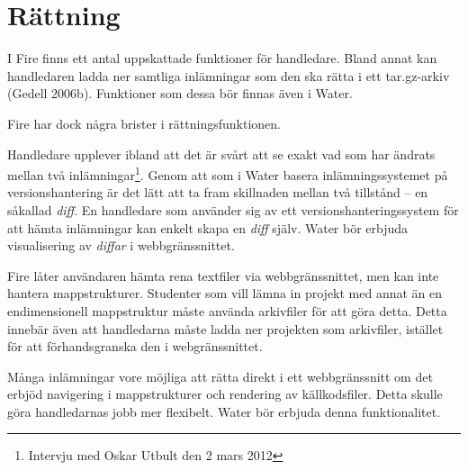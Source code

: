 \section{Rättning}

I Fire finns ett antal uppskattade funktioner för handledare. Bland annat kan handledaren ladda ner samtliga inlämningar som den ska rätta i ett tar.gz-arkiv (Gedell 2006b). Funktioner som dessa bör finnas även i Water.

Fire har dock några brister i rättningsfunktionen.

Handledare upplever ibland att det är svårt att se exakt vad som har ändrats mellan två inlämningar\footnote{Intervju med Oskar Utbult den 2 mars 2012}. Genom att som i Water basera inlämningssystemet på versionshantering är det lätt att ta fram skillnaden mellan två tillstånd – en såkallad \emph{diff}. En handledare som använder sig av ett versionshanteringssystem för att hämta inlämningar kan enkelt skapa en \emph{diff} själv. Water bör erbjuda visualisering av \emph{diffar} i webbgränssnittet.

Fire låter användaren hämta rena textfiler via webbgränssnittet, men kan inte hantera mappstrukturer. Studenter som vill lämna in projekt med annat än en endimensionell mappstruktur måste använda arkivfiler för att göra detta. Detta innebär även att handledarna måste ladda ner projekten som arkivfiler, istället för att förhandsgranska den i webgränssnittet.

Många inlämningar vore möjliga att rätta direkt i ett webbgränssnitt om det erbjöd navigering i mappstrukturer och rendering av källkodsfiler. Detta skulle göra handledarnas jobb mer flexibelt. Water bör erbjuda denna funktionalitet.

